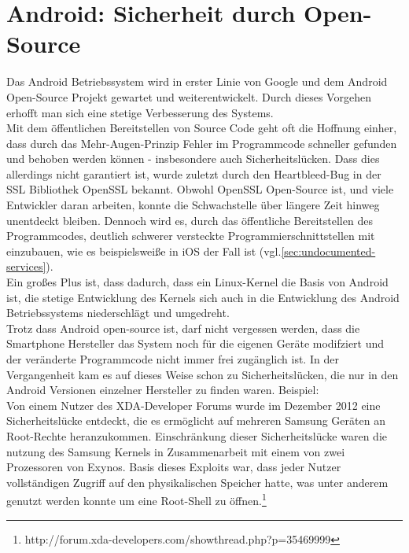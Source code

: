 \section{Android: Sicherheit durch Open-Source}
Das Android Betriebssystem wird in erster Linie von Google und dem Android Open-Source Projekt gewartet und weiterentwickelt. Durch dieses Vorgehen erhofft man sich eine stetige Verbesserung des Systems. \\
Mit dem öffentlichen Bereitstellen von Source Code geht oft die Hoffnung einher, dass durch das Mehr-Augen-Prinzip Fehler im Programmcode schneller gefunden und behoben werden können - insbesondere auch Sicherheitslücken.
Dass dies allerdings nicht garantiert ist, wurde zuletzt durch den Heartbleed-Bug in der SSL Bibliothek OpenSSL bekannt. Obwohl OpenSSL Open-Source ist, und viele Entwickler daran arbeiten, konnte die Schwachstelle über längere Zeit hinweg unentdeckt bleiben. Dennoch wird es, durch das öffentliche Bereitstellen des Programmcodes, deutlich schwerer versteckte Programmierschnittstellen mit einzubauen, wie es beispielsweiße in iOS der Fall ist (vgl.\ref{sec:undocumented-services}).\\
Ein großes Plus ist, dass dadurch, dass ein Linux-Kernel die Basis von Android ist, die stetige Entwicklung des Kernels sich auch in die Entwicklung des Android Betriebssystems niederschlägt und umgedreht.\\
Trotz dass Android open-source ist, darf nicht vergessen werden, dass die Smartphone Hersteller das System noch für die eigenen Geräte modifziert und der veränderte Programmcode nicht immer frei zugänglich ist. In der Vergangenheit kam es auf dieses Weise schon zu Sicherheitslücken, die nur in den Android Versionen einzelner Hersteller zu finden waren. Beispiel:\\
Von einem Nutzer des XDA-Developer Forums wurde im Dezember 2012 eine Sicherheitslücke entdeckt, die es ermöglicht auf mehreren Samsung Geräten an Root-Rechte heranzukommen. Einschränkung dieser Sicherheitslücke waren die nutzung des Samsung Kernels in Zusammenarbeit mit einem von zwei Prozessoren von Exynos. Basis dieses Exploits war, dass jeder Nutzer vollständigen Zugriff auf den physikalischen Speicher hatte, was unter anderem genutzt werden konnte um eine Root-Shell zu öffnen.\footnote{http://forum.xda-developers.com/showthread.php?p=35469999} \\
